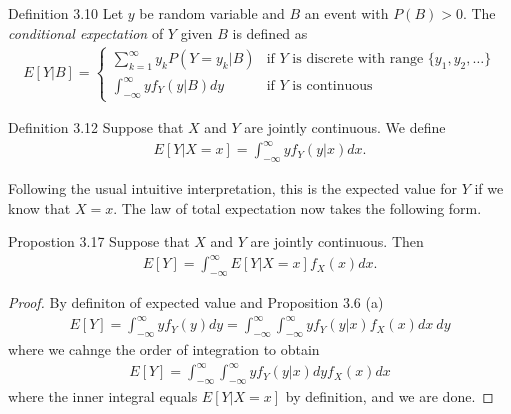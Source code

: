 \begin{boks}{Definition 3.10}
  Let $y$ be random variable and $B$ an event with $P(B)>0$. The \textit{conditional expectation} of $Y$ given $B$ is defined as
  \begin{align*}
    E[Y|B] =  \begin{cases}
                \sum_{k = 1}^\infty y_k P(Y = y_k|B) & \text{if $Y$ is discrete with range $\{y_1, y_2, \ldots\}$}\\
                \int_{-\infty}^\infty yf_Y(y|B)dy & \text{if $Y$ is continuous}
              \end{cases}
  \end{align*}
\end{boks}


\begin{boks}{Definition 3.12}
  Suppose that $X$ and $Y$ are jointly continuous. We define
  \begin{align*}
    E[Y|X = x] = \int_{-\infty}^\infty y f_Y(y|x)dx.
  \end{align*}
\end{boks}

Following the usual intuitive interpretation, this is the expected value for $Y$ if we know that $X = x$. The law of total expectation now takes the following form.

\begin{boks}{Propostion 3.17}
  Suppose that $X$ and $Y$ are jointly continuous. Then
  \begin{align*}
    E[Y] = \int_{-\infty}^\infty E[Y|X = x] f_X(x)dx.
  \end{align*}
\end{boks}
\begin{proof}
  By definiton of expected value and Proposition 3.6 (a)
  \begin{align*}
    E[Y] =  \int_{-\infty}^\infty y f_Y(y)dy = \int_{-\infty}^\infty \int_{-\infty}^\infty yf_Y(y|x)f_X(x)dx \ dy
  \end{align*}
  where we cahnge the order of integration to obtain
  \begin{align*}
    E[Y] = \int_{-\infty}^\infty\int_{-\infty}^\infty y f_Y(y|x)dy f_X(x)dx
  \end{align*}
  where the inner integral equals $E[Y|X = x]$ by definition, and we are done.
\end{proof}

